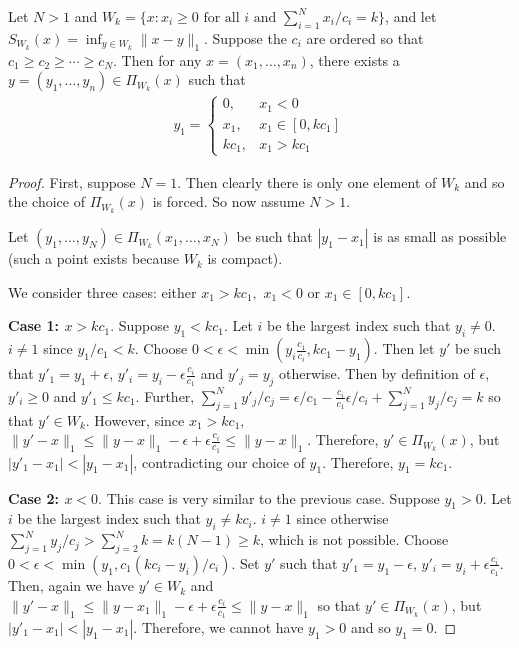 \documentclass[12pt]{colt2018} %
\newcommand{\x}{{x_\star}}
\begin{document}
\begin{Proposition}\label{thm:canbegreedy}
Let $N>1$ and $W_k=\{x:x_i\ge 0\text{ for all }i\text{ and }\sum_{i=1}^N x_i/c_i=k\}$, and let $S_{W_k}(x) = \inf_{y\in W_k} \|x-y\|_1$. Suppose the $c_i$ are ordered so that $c_1\ge c_2\ge\cdots\ge c_N$. Then for any $x=(x_1,\dots,x_n)$, there exists a $y=(y_1,\dots,y_n)\in \Pi_{W_k}(x)$ such that
\begin{align*}
y_1 = \left\{\begin{array}{lr}0,&x_1<0\\x_1,&x_1\in[0,kc_1]\\kc_1,&x_1>kc_1\end{array}\right.
\end{align*}
\end{Proposition}
\begin{proof}
First, suppose $N=1$. Then clearly there is only one element of $W_k$ and so the choice of $\Pi_{W_k}(x)$ is forced. So now assume $N>1$.

Let $(y_1,\dots,y_N)\in \Pi_{W_k}(x_1,\dots,x_N)$ be such that $|y_1-x_1|$ is as small as possible (such a point exists because $W_k$ is compact).

We consider three cases: either $x_1> kc_1,$ $x_1<0$ or $x_1\in [0, kc_1]$. 

\textbf{Case 1: $x> kc_1$}. Suppose $y_1 < kc_1$. Let $i$ be the largest index such that $y_i\ne 0$. $i\ne 1$ since $y_1/c_1<k$. Choose $0<\epsilon<\min(y_i\frac{c_1}{c_i}, kc_1-y_1)$. Then let $y'$ be such that $y'_1 = y_1+\epsilon$, $y'_i = y_i - \epsilon\frac{c_i}{c_1}$ and $y'_j = y_j$ otherwise. Then by definition of $\epsilon$, $y'_i\ge 0$ and $y'_1\le k c_1$. Further, $\sum_{j=1}^N y'_j/c_j = \epsilon/c_1 - \frac{c_i}{c_1}\epsilon/c_i+\sum_{j=1}^N y_j/c_j=k$ so that $y'\in W_k$. However, since $x_1>kc_1,$ $\|y'-x\|_1\le \|y-x\|_1-\epsilon + \epsilon\frac{c_i}{c_1}\le \|y-x\|_1$. Therefore, $y'\in \Pi_{W_k}(x)$, but $|y'_1-x_1|< |y_1-x_1|$, contradicting our choice of $y_1$. Therefore, $y_1=k c_1$.

\textbf{Case 2: $x<0$}. This case is very similar to the previous case. Suppose $y_1>0$. Let $i$ be the largest index such that $y_i\ne kc_i$. $i\ne 1$ since otherwise $\sum_{j=1}^N y_j/c_j > \sum_{j=2}^N k = k(N-1)\ge k$, which is not possible. Choose $0<\epsilon<\min(y_1,c_1(kc_i - y_i)/c_i)$. Set $y'$ such that $y'_1 = y_1-\epsilon$, $y'_i = y_i + \epsilon \frac{c_i}{c_1}$. Then, again we have $y'\in W_k$ and $\|y'-x\|_1\le \|y-x_1\|_1-\epsilon + \epsilon\frac{c_i}{c_1}\le \|y-x\|_1$ so that $y'\in \Pi_{W_k}(x)$, but $|y'_1-x_1|<|y_1-x_1|$. Therefore, we cannot have $y_1>0$ and so $y_1=0$.


\end{proof}
\end{document}
